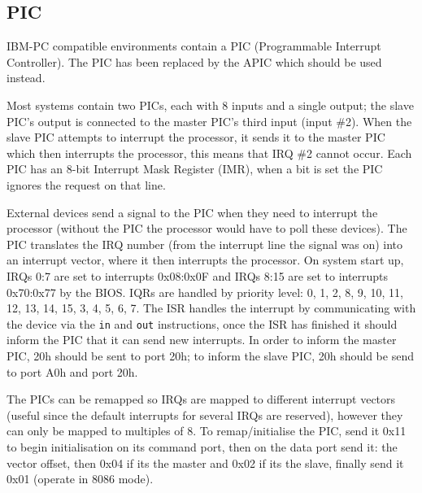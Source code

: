 \documentclass{article}
\newcommand{\layout}[1]{\parbox{\linewidth}{#1}}
\begin{document}
\layout{
  \subsection{PIC}

  IBM-PC compatible environments contain a PIC (Programmable Interrupt Controller).
  The PIC has been replaced by the APIC which should be used instead.
} \bigskip

\layout{
  Most systems contain two PICs, each with 8 inputs and a single output; the slave PIC's output is connected to the master PIC's third input (input \#2).
  When the slave PIC attempts to interrupt the processor, it sends it to the master PIC which then interrupts the processor, this means that IRQ \#2 cannot occur.
  Each PIC has an 8-bit Interrupt Mask Register (IMR), when a bit is set the PIC ignores the request on that line.
} \bigskip

\layout{
  External devices send a signal to the PIC when they need to interrupt the processor (without the PIC the processor  would have to poll these devices).
  The PIC translates the IRQ number (from the interrupt line the signal was on) into an interrupt vector, where it then interrupts the processor.
  On system start up, IRQs 0:7 are set to interrupts 0x08:0x0F and IRQs 8:15 are set to interrupts 0x70:0x77 by the BIOS.
  IQRs are handled by priority level: 0, 1, 2, 8, 9, 10, 11, 12, 13, 14, 15, 3, 4, 5, 6, 7.
  The ISR handles the interrupt by communicating with the device via the \texttt{in} and \texttt{out} instructions, once the ISR has finished it should inform the PIC that it can send new interrupts.
  In order to inform the master PIC, 20h should be sent to port 20h;
  to inform the slave PIC, 20h should be send to port A0h and port 20h.
} \bigskip

\layout{
  The PICs can be remapped so IRQs are mapped to different interrupt vectors (useful since the default interrupts for several IRQs are reserved), however they can only be mapped to multiples of 8.
  To remap/initialise the PIC, send it 0x11 to begin initialisation on its command port, then on the data port send it: the vector offset, then 0x04 if its the master and 0x02 if its the slave, finally send it 0x01 (operate in 8086 mode).
} \bigskip
\end{document}
